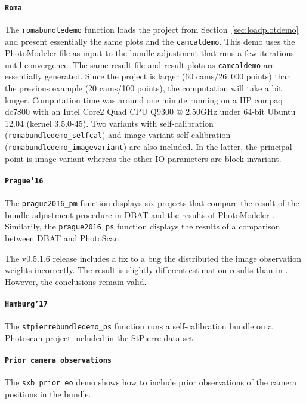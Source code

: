\documentclass{article}
\begin{document}
\paragraph{\texttt{Roma}}
\label{sec:orgd25ef8a}
\sloppy The \texttt{romabundledemo} function loads the project from
Section~\ref{sec:loadplotdemo} and present essentially the same plots and
the \texttt{camcaldemo}. This demo uses the PhotoModeler file as input
to the bundle adjustment that runs a few iterations until convergence.
The same result file and result plots as \texttt{camcaldemo} are
essentially generated. Since the project is larger (60 cams/26~000
points) than the previous example (20 cams/100 points), the
computation will take a bit longer. Computation time was around one
minute running on a HP compaq dc7800 with an Intel Core2 Quad CPU
Q9300 @ 2.50GHz under 64-bit Ubuntu 12.04 (kernel 3.5.0-45). Two
variants with self-calibration (\texttt{romabundledemo\_selfcal}) and
image-variant self-calibration (\texttt{romabundledemo\_imagevariant})
are also included. In the latter, the principal point is image-variant
whereas the other IO parameters are block-invariant.

\paragraph{\texttt{Prague'16}}
\label{sec:org86d47d3}
The \texttt{prague2016\_pm} function displays six projects that
compare the result of the bundle adjustment procedure in DBAT and the
results of PhotoModeler \citep{Borlin2016:External}. Similarily, the
\texttt{prague2016\_ps} function displays the results of a comparison
between DBAT and PhotoScan.

The v0.5.1.6 release includes a fix to a bug the distributed the image
observation weights incorrectly. The result is slightly different
estimation results than in \citet{Borlin2016:External}. However, the
conclusions remain valid.

\paragraph{\texttt{Hamburg'17}}
\label{sec:orgd3360a3}
The \texttt{stpierrebundledemo\_ps} function runs a self-calibration
bundle on a Photoscan project included in the StPierre data set.

\paragraph{\texttt{Prior camera observations}}
\label{sec:org320a1b8}
The \texttt{sxb\_prior\_eo} demo shows how to include prior
observations of the camera positions in the bundle.
\end{document}
